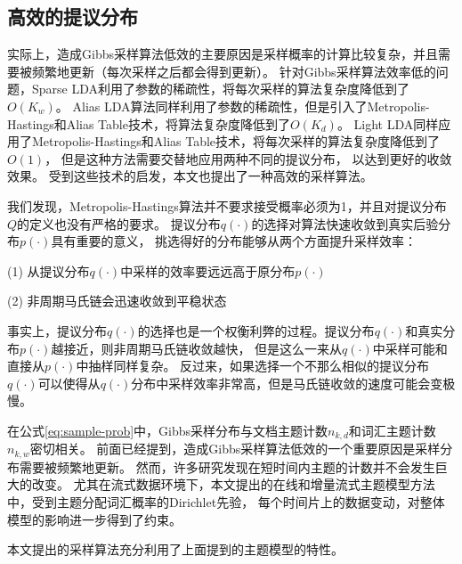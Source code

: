 \subsection{高效的提议分布}
实际上，造成Gibbs采样算法低效的主要原因是采样概率的计算比较复杂，并且需要被频繁地更新（每次采样之后都会得到更新）。
针对Gibbs采样算法效率低的问题，Sparse LDA利用了参数的稀疏性，将每次采样的算法复杂度降低到了$O(K_w)$。
Alias LDA算法同样利用了参数的稀疏性，但是引入了Metropolis-Hastings和Alias Table技术，将算法复杂度降低到了$O(K_d)$。
Light LDA同样应用了Metropolis-Hastings和Alias Table技术，将每次采样的算法复杂度降低到了$O(1)$，
但是这种方法需要交替地应用两种不同的提议分布，
以达到更好的收敛效果。
受到这些技术的启发，本文也提出了一种高效的采样算法。

我们发现，Metropolis-Hastings算法并不要求接受概率必须为1，并且对提议分布$Q$的定义也没有严格的要求。
提议分布$q(\cdot)$的选择对算法快速收敛到真实后验分布$p(\cdot)$具有重要的意义，
挑选得好的分布能够从两个方面提升采样效率：

(1) 从提议分布$q(\cdot)$中采样的效率要远远高于原分布$p(\cdot)$

(2) 非周期马氏链会迅速收敛到平稳状态

事实上，提议分布$q(\cdot)$的选择也是一个权衡利弊的过程。提议分布$q(\cdot)$和真实分布$p(\cdot)$越接近，则非周期马氏链收敛越快，
但是这么一来从$q(\cdot)$中采样可能和直接从$p(\cdot)$中抽样同样复杂。
反过来，如果选择一个不那么相似的提议分布$q(\cdot)$可以使得从$q(\cdot)$分布中采样效率非常高，但是马氏链收敛的速度可能会变极慢。



在公式\ref{eq:sample-prob}中，Gibbs采样分布与文档主题计数$n_{k,d}$和词汇主题计数$n_{k,w}$密切相关。
前面已经提到，造成Gibbs采样算法低效的一个重要原因是采样分布需要被频繁地更新。
然而，许多研究发现在短时间内主题的计数并不会发生巨大的改变。
尤其在流式数据环境下，本文提出的在线和增量流式主题模型方法中，受到主题分配词汇概率的Dirichlet先验，
每个时间片上的数据变动，对整体模型的影响进一步得到了约束。

本文提出的采样算法充分利用了上面提到的主题模型的特性。

